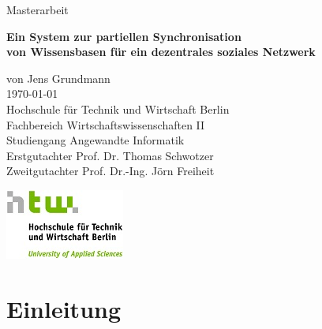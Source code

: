 \documentclass[a4paper]{article}
\begin{document}
	\begin{titlepage}
		\begin{flushright}
			{\large Masterarbeit \\}
			\begin{Large}
				\textbf{
					Ein System zur partiellen Synchronisation \\ 
					von Wissensbasen für ein dezentrales soziales Netzwerk \\
				} 
			\end{Large}
			\vspace{1.0cm}
			\begin{large}	
				von Jens Grundmann \\
				\today \\
				\vspace{1.0cm}
				Hochschule für Technik und Wirtschaft Berlin \\
				Fachbereich Wirtschaftswissenschaften II \\
				Studiengang Angewandte Informatik \\
				\vspace{1.0cm}
				Erstgutachter Prof. Dr. Thomas Schwotzer \\
				Zweitgutachter Prof. Dr.-Ing. Jörn Freiheit \\	
				\vspace{0.5cm}
				\begin{center}
					\includegraphics{../Bilder/htw_logo.jpg}
				\end{center}				
			\end{large}
		\end{flushright}	
	\end{titlepage}
	
	\ClearWallPaper	
	\newpage
	
	
	
	\newpage	
	\tableofcontents
	\newpage

	\section{Einleitung}
	
\end{document}
